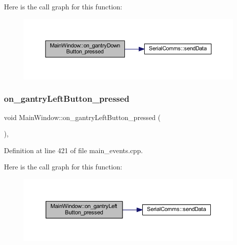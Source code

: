Here is the call graph for this function\+:
\nopagebreak
\begin{figure}[H]
\begin{center}
\leavevmode
\includegraphics[width=350pt]{classMainWindow_a04c1e4428230f33e991ff87aed62575f_cgraph}
\end{center}
\end{figure}
\mbox{\label{classMainWindow_a116f8869b68f5d57afe1849fd1f0f0f7}} 
\subsubsection{\texorpdfstring{on\_gantryLeftButton\_pressed}{on\_gantryLeftButton\_pressed}}
{\footnotesize\ttfamily void Main\+Window\+::on\+\_\+gantry\+Left\+Button\+\_\+pressed (\begin{DoxyParamCaption}{ }\end{DoxyParamCaption})\hspace{0.3cm}{\ttfamily [private]}, {\ttfamily [slot]}}



Definition at line 421 of file main\+\_\+events.\+cpp.

Here is the call graph for this function\+:
\nopagebreak
\begin{figure}[H]
\begin{center}
\leavevmode
\includegraphics[width=350pt]{classMainWindow_a116f8869b68f5d57afe1849fd1f0f0f7_cgraph}
\end{center}
\end{figure}
\mbox{\label{classMainWindow_a2456f40cbc5747391f01b61c59edd6dd}} 

